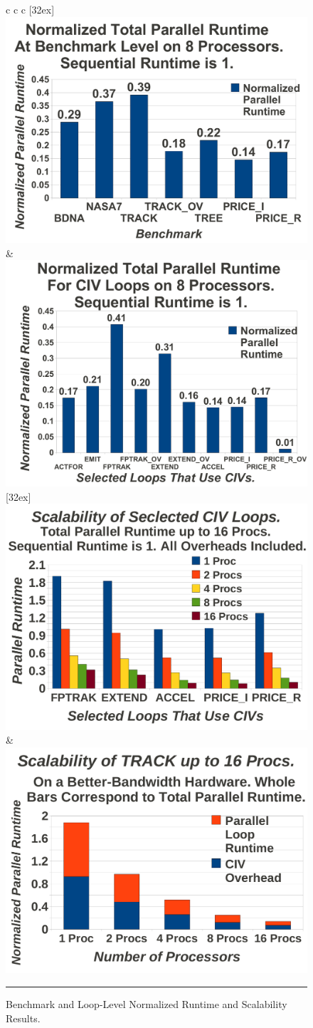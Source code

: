\documentclass{sig-alternate}
\begin{document}
\begin{figure}[t]
	\begin{tabular}{c c c} 
	[32ex]
	{      		%
                \includegraphics[width=.35\textwidth]{Figures/EmpRes/BenchParResNew} \vspace{2ex}     
	} & { \hspace{-55ex}
                    \includegraphics[width=.35\textwidth]{Figures/EmpRes/LoopParResNew} \vspace{2ex}
	} \\ 
	[32ex]
	{           
                \includegraphics[width=.35\textwidth]{Figures/EmpRes/LoopScalRes}
	} & { \hspace{16ex}
                \includegraphics[width=.35\textwidth]{Figures/EmpRes/TrackScalNew}
	}
\end{tabular}
\hrule
\caption{ Benchmark and Loop-Level Normalized Runtime and Scalability Results. }
\label{fig:ParRuntime} %
\end{figure}
\end{document}
